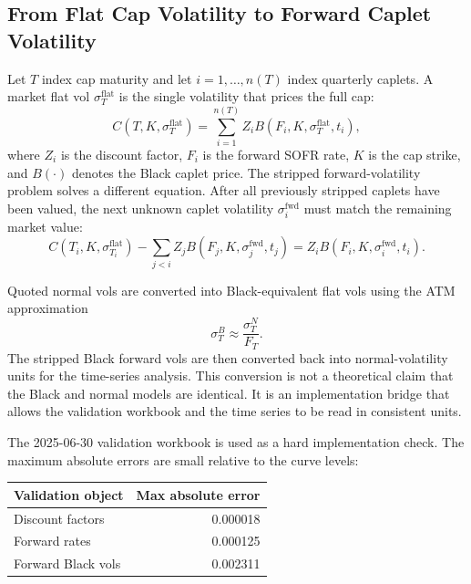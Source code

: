 \documentclass[12pt]{article}
\begin{document}
\subsection{From Flat Cap Volatility to Forward Caplet Volatility}

Let $T$ index cap maturity and let $i=1,\ldots,n(T)$ index quarterly caplets. A market flat vol
$\sigma_T^{\mathrm{flat}}$ is the single volatility that prices the full cap:
\begin{equation}
    C(T,K,\sigma_T^{\mathrm{flat}})
    = \sum_{i=1}^{n(T)} Z_i B(F_i,K,\sigma_T^{\mathrm{flat}},t_i),
\end{equation}
where $Z_i$ is the discount factor, $F_i$ is the forward SOFR rate, $K$ is the cap strike, and
$B(\cdot)$ denotes the Black caplet price. The stripped forward-volatility problem solves a
different equation. After all previously stripped caplets have been valued, the next unknown
caplet volatility $\sigma_i^{\mathrm{fwd}}$ must match the remaining market value:
\begin{equation}
    C(T_i,K,\sigma_{T_i}^{\mathrm{flat}})
    - \sum_{j<i} Z_j B(F_j,K,\sigma_j^{\mathrm{fwd}},t_j)
    =
    Z_i B(F_i,K,\sigma_i^{\mathrm{fwd}},t_i).
\end{equation}

Quoted normal vols are converted into Black-equivalent flat vols using the ATM approximation
\begin{equation}
    \sigma_T^B \approx \frac{\sigma_T^N}{F_T}.
\end{equation}
The stripped Black forward vols are then converted back into normal-volatility units for the
time-series analysis. This conversion is not a theoretical claim that the Black and normal models
are identical. It is an implementation bridge that allows the validation workbook and the time
series to be read in consistent units.

The 2025-06-30 validation workbook is used as a hard implementation check. The maximum
absolute errors are small relative to the curve levels:

\begin{center}
\begin{tabular}{l r}
\toprule
Validation object & Max absolute error \\
\midrule
Discount factors & 0.000018 \\
Forward rates & 0.000125 \\
Forward Black vols & 0.002311 \\
\bottomrule
\end{tabular}
\end{center}
\end{document}
